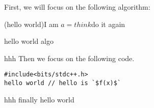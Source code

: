 


\def\HWTITLE{Homework 2}
\def\COURSECODE{CS 225: Data Structures}
\def\AUTHOR{Group D1}



\makeMyTitle
\thispagestyle{firstPage}

\begin{questions}
    \question
    First, we will focus on the following algorithm:
    \begin{algorithm}
        \While(hello world){I am $a = think$}{do it again}
        \caption{hello world algo}
    \end{algorithm}

    \newpage hhh
    \question Then we focus on the following code.
    \begin{lstlisting}
#include<bits/stdc++.h>
hello world // hello is `$f(x)$`
    \end{lstlisting}

    \newpage hhh
    \question finally hello world

\end{questions}



